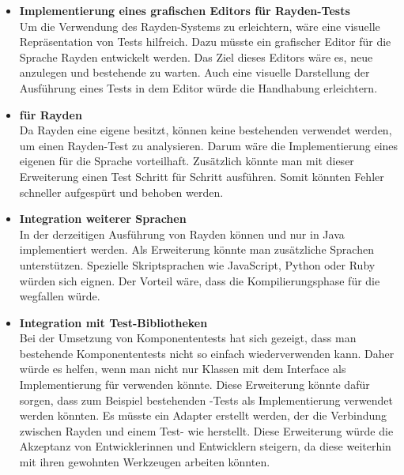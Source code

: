 \begin{itemize}
\item \textbf{Implementierung eines grafischen Editors für Rayden-Tests}\\
Um die Verwendung des Rayden-Systems zu erleichtern, wäre eine visuelle Repräsentation von Tests hilfreich. Dazu müsste ein grafischer Editor für die Sprache Rayden entwickelt werden. Das Ziel dieses Editors wäre es, neue  anzulegen und bestehende zu warten. Auch eine visuelle Darstellung der Ausführung eines Tests in dem Editor würde die Handhabung erleichtern.\\

\item \textbf{ für Rayden}\\
Da Rayden eine eigene  besitzt, können keine bestehenden  verwendet werden, um einen Rayden-Test zu analysieren. Darum wäre die Implementierung eines eigenen  für die Sprache vorteilhaft. Zusätzlich könnte man mit dieser Erweiterung einen Test Schritt für Schritt ausführen. Somit könnten Fehler schneller aufgespürt und behoben werden.\\

\item \textbf{Integration weiterer Sprachen}\\
In der derzeitigen Ausführung von Rayden können  und  nur in Java implementiert werden. Als Erweiterung könnte man zusätzliche Sprachen unterstützen. Spezielle Skriptsprachen wie JavaScript, Python oder Ruby würden sich eignen. Der Vorteil wäre, dass die Kompilierungsphase für die  wegfallen würde. \\

\item \textbf{Integration mit Test-Bibliotheken}\\
Bei der Umsetzung von Komponententests hat sich gezeigt, dass man bestehende Komponententests nicht so einfach wiederverwenden kann. Daher würde es helfen, wenn man nicht nur Klassen mit dem Interface  als Implementierung für  verwenden könnte. Diese Erweiterung könnte dafür sorgen, dass zum Beispiel bestehenden -Tests als Implementierung verwendet werden könnten. Es müsste ein Adapter erstellt werden, der die Verbindung zwischen Rayden und einem Test- wie  herstellt. Diese Erweiterung würde die Akzeptanz von Entwicklerinnen und Entwicklern steigern, da diese weiterhin mit ihren gewohnten Werkzeugen arbeiten könnten. 

\end{itemize}

